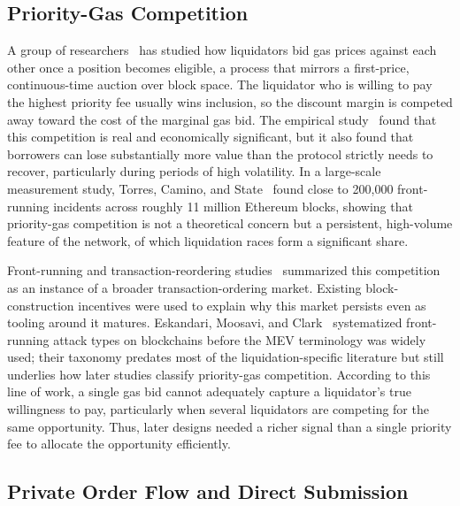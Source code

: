 \documentclass{llncs}
\begin{document}
\subsection{Priority-Gas Competition}

A group of researchers~\cite{qin2021empirical} has studied how
liquidators bid gas prices against each other once a position becomes
eligible, a process that mirrors a first-price, continuous-time auction
over block space. The liquidator who is willing to pay the highest
priority fee usually wins inclusion, so the discount margin is
competed away toward the cost of the marginal gas bid. The empirical
study~\cite{qin2021empirical} found that this competition is real and
economically significant, but it also found that borrowers can lose
substantially more value than the protocol strictly needs to recover,
particularly during periods of high volatility. In a large-scale
measurement study, Torres, Camino, and State~\cite{torres2021frontrunner}
found close to 200{,}000 front-running incidents across roughly 11
million Ethereum blocks, showing that priority-gas competition is not a
theoretical concern but a persistent, high-volume feature of the
network, of which liquidation races form a significant share.

Front-running and transaction-reordering studies~\cite{daian2019flash}
summarized this competition as an instance of a broader
transaction-ordering market. Existing block-construction incentives were
used to explain why this market persists even as tooling around it
matures. Eskandari, Moosavi, and Clark~\cite{eskandari2019sok}
systematized front-running attack types on blockchains before the MEV
terminology was widely used; their taxonomy predates most of the
liquidation-specific literature but still underlies how later studies
classify priority-gas competition. According to this line of work, a
single gas bid cannot adequately capture a liquidator's true willingness
to pay, particularly when several liquidators are competing for the
same opportunity. Thus, later designs needed a richer signal than a
single priority fee to allocate the opportunity efficiently.

\subsection{Private Order Flow and Direct Submission}
\end{document}
